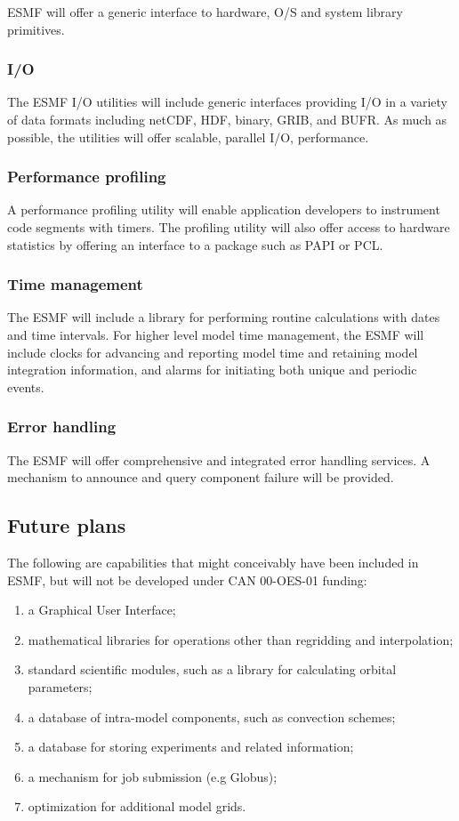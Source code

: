 ESMF will offer a generic interface to hardware, O/S and system
library primitives.

\subsubsection{I/O}

The ESMF I/O utilities will include generic interfaces providing I/O
in a variety of data formats including netCDF, HDF, binary, GRIB, and
BUFR. As much as possible, the utilities will offer scalable, parallel I/O,
performance.

\subsubsection{Performance profiling}

A performance profiling utility will enable application developers to 
instrument code segments with timers. The profiling utility will also
offer access to hardware statistics by offering an interface to a
package such as PAPI or PCL.

\subsubsection{Time management}

The ESMF will include a library for performing routine 
calculations with dates and time intervals.  For higher level model
time management, the ESMF will include clocks for advancing and 
reporting model time and retaining model integration information, 
and alarms for initiating both unique and periodic events.

\subsubsection{Error handling}

The ESMF will offer comprehensive and integrated error handling
services.  A mechanism to announce and query component failure will be
provided.

\subsection{Future plans}

The following are capabilities that might conceivably have been
included in ESMF, but will not be developed under CAN 00-OES-01
funding:
\begin{enumerate}
\item a Graphical User Interface;
\item mathematical libraries for operations other than regridding and
  interpolation;
\item standard scientific modules, such as a library for calculating
  orbital parameters;
\item a database of intra-model components, such as convection schemes;
\item a database for storing experiments and related information;
\item a mechanism for job submission (e.g Globus);
\item optimization for additional model grids.
\end{enumerate}

